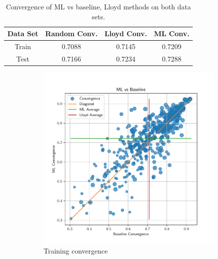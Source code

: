 \documentclass{article}
\begin{document}
\begin{table}[h]
  \centering
  \begin{tabular}{c c c c}
    \textbf{Data Set} & \textbf{Random Conv.} & \textbf{Lloyd Conv.} & \textbf{ML Conv.} \\
    \hline
    Train & 0.7088 & 0.7145 & 0.7209 \\
    Test & 0.7166 & 0.7234 & 0.7288 \\
    \hline
  \end{tabular}
  \caption{Convergence of ML vs baseline, Lloyd methods on both data sets.}
  \label{tab:conv}
\end{table}

\begin{figure}[!hb]
  \centering
  \begin{subfigure}[t]{0.49\textwidth}
    \centering
    \includegraphics[width=\textwidth]{aniso3d_train_baseline_ml_convergence.pdf}
    \caption{Training convergence}
  \end{subfigure}
  \begin{subfigure}[t]{0.49\textwidth}
    \centering

\end{subfigure}
\end{figure}
\end{document}
